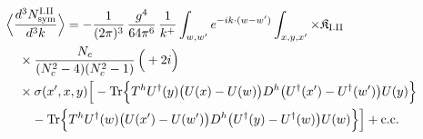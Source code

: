 \begin{align}\label{eq:S-I.II-3}
&\Big\langle\frac{d^{3}N^{\rm I.II}_{{\rm sym}}}{d^{3}k}\Big\rangle=-\frac{1}{(2\pi)^{3}}\, \frac{g^{4}}{64\pi^{6}}\, \frac{1}{k^{+}} \int_{w,w'}e^{-ik\cdot(w-w')} \int_{x,y,x'} \times \mathfrak{K}_{\rm I.II}\notag\\
&\quad \times \frac{N_{c}}{(N_{c}^{2}-4)(N_{c}^{2}-1)}\, \Big(+2i\Big)\notag\\
&\quad \times \sigma(x',x,y)\Big[-{\rm Tr}\Big\{T^{h}U^{\dagger}(y)\big(U(x)-U(w)\big)D^{h}\big(U^{\dagger}(x')-U^{\dagger}(w')\big)U(y)\Big\}\notag\\
&\quad\quad -{\rm Tr}\Big\{T^{h}U^{\dagger}(w)\big(U(x')-U(w')\big)D^{h}\big(U^{\dagger}(y)-U^{\dagger}(w)\big)U(w)\Big\}\Big] +{\rm c.c.}
\end{align}
